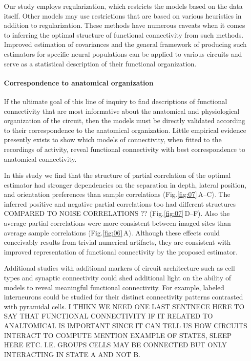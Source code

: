 \documentclass[10pt]{article}
\newcommand{\figref}[2]{Fig.\;\ref{fig:#1}\,#2}
\begin{document}
Our study employs regularization, which restricts the models based on the data itself. Other models may use restrictions that are based on various heuristics in addition to regularization.  These methods have numerous caveats when it comes to inferring the optimal structure of functional connectivity from such methods. Improved estimation of covariances and the general framework of producing such estimators for specific neural populations can be applied to various circuits and serve as a statistical description of their functional organization. 

\paragraph{Correspondence to anatomical organization}
If the ultimate goal of this line of inquiry to find descriptions of functional connectivity that are most informative about the anatomical and physiological organization of the circuit, then the models must be directly validated according to their correspondence to the anatomical organization. Little empirical evidence presently exists to show which models of connectivity, when fitted to the recordings of activity, reveal functional connectivity with best correspondence to anatomical connectivity. 

In this study we find that the structure of partial correlation of the optimal estimator had stronger dependencies on the separation in depth, lateral position, and orientation preferences than sample correlations (\figref{07}{A--C}). The inferred positive and negative partial correlations too had different structures COMPARED TO NOISE CORRELATIONS ?? (\figref{07}{D--F}).  Also the average partial correlations were more consistent between imaged sites than average sample correlations (\figref{06}{A}). Although these effects could conceivably results from trivial numerical artifacts, they are consistent with improved representation of functional connectivity by the proposed estimator.

Additional studies with additional markers of circuit architecture such as cell types and synaptic connectivity could shed additional light on the ability of models to reveal meaningful functional connectivity.  For example, labeled interneurons could be studied for their distinct connectivity patterns contrasted with pyramidal cells. I THIKN WE NEED ONE LAST SENTNECE HERE TO SAY THAT FUNCTIONAL CONNECTIVITY IF IT RELATED TO ANALTOMICAL IS IMPORTANT SINCE IT CAN TELL US HOW CIRCUITS INTERACT TO COMPUTE MENTION EXAMPLE OF STATES, SLEEP HERE ETC. I.E. GROUPS CELLS MAY BE CONNECTED BUT ONLY INTERACTING IN STATE A AND NOT B. 
\end{document}
